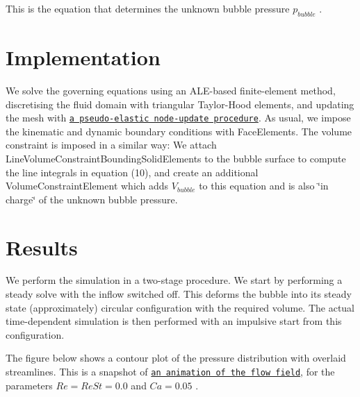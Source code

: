 This is the equation that determines the unknown bubble pressure $ p_{bubble} $ .



 

\hypertarget{index_implementation}{}\section{Implementation}\label{index_implementation}
We solve the governing equations using an A\+L\+E-\/based finite-\/element method, discretising the fluid domain with triangular Taylor-\/\+Hood elements, and updating the mesh with \href{../../single_layer_free_surface/html/index.html#kinematic_condition_implementation}{\tt a pseudo-\/elastic node-\/update procedure}. As usual, we impose the kinematic and dynamic boundary conditions with {\ttfamily Face\+Elements}. The volume constraint is imposed in a similar way\+: We attach {\ttfamily Line\+Volume\+Constraint\+Bounding\+Solid\+Elements} to the bubble surface to compute the line integrals in equation (10), and create an additional {\ttfamily Volume\+Constraint\+Element} which adds $ V_{bubble} $ to this equation and is also \char`\"{}in
charge\char`\"{} of the unknown bubble pressure.



 

\hypertarget{index_results}{}\section{Results}\label{index_results}
We perform the simulation in a two-\/stage procedure. We start by performing a steady solve with the inflow switched off. This deforms the bubble into its steady state (approximately) circular configuration with the required volume. The actual time-\/dependent simulation is then performed with an impulsive start from this configuration.

The figure below shows a contour plot of the pressure distribution with overlaid streamlines. This is a snapshot of \href{../figures/bubble.avi}{\tt an animation of the flow field}, for the parameters $ Re=ReSt=0.0 $ and $ Ca=0.05 $ .

